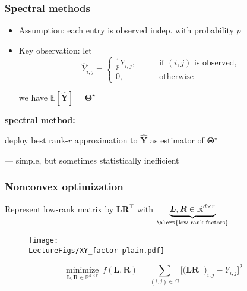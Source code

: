 \documentclass[compress,
mathserif,wide,%
]{beamer}
\begin{document}
\begin{frame}
  \frametitle{Spectral methods}

  \begin{itemize}
  \item Assumption: each entry is observed indep. with probability $p$ \pause
  \item Key observation: let
  \[
  \hat Y_{i,j} = \begin{cases} \frac{1}{p} Y_{i,j},\qquad & \text{if }(i,j) \text{ is observed}, \\
  0,\qquad & \text{otherwise}
  \end{cases}
  \]

  we have $\mathbb{E} [ \hat{\bm{Y}} ] = \bm{\Theta}^{\star}$
  \end{itemize}

  \pause
  \vfill
  {

\begin{varblock}[\textwidth]{}
\textbf{spectral method:} \\
\begin{center}
deploy best rank-$r$ approximation to $\hat{\bm{Y}}$ as estimator of $\bm{\Theta}^{\star}$
\end{center}
  \end{varblock}
}

\pause
\hfill --- simple, but sometimes statistically inefficient 
\end{frame}



\begin{frame}
\frametitle{Nonconvex optimization}

\bigskip

  Represent low-rank matrix by $\bm{L}\bm{R}^{\top}$ with $\underset{\alert{\text{low-rank factors}}}{\underbrace{\bm{L},\bm{R}\in \mathbb{R}^{d\times r}}}$ 


\begin{figure}
  \texttt{[image: \\LectureFigs/XY\_factor-plain.pdf]}
\end{figure}

\vfill
{


\begin{varblock}[\textwidth]{}
\[
  \underset{\bm{L},\bm{R}\in \mathbb{R}^{d\times r}}{\text{minimize}}~~ f(\bm{L},\bm{R})=  \sum_{(i,j)\in\Omega}\Big[ \big( \bm{L}\bm{R}^{\top} \big)_{i,j} - Y_{i,j} \Big]^{2} 
\]  
\end{varblock}
}


\end{frame}
\end{document}
